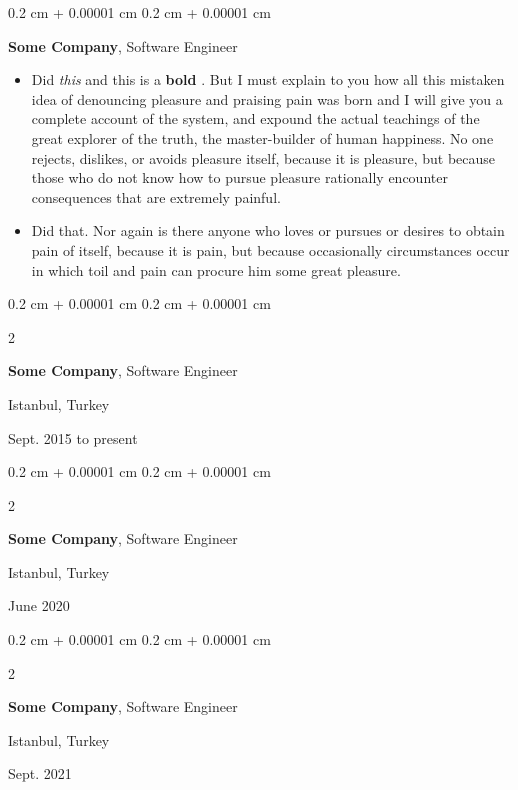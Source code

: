 \documentclass[10pt, letterpaper]{article}
\newenvironment{highlights}{
    \begin{itemize}[
        topsep=0.10 cm,
        parsep=0.10 cm,
        partopsep=0pt,
        itemsep=0pt,
        leftmargin=0.4 cm + 10pt
    ]
}{
    \end{itemize}
} %
\newenvironment{onecolentry}{
    \begin{adjustwidth}{
        0.2 cm + 0.00001 cm
    }{
        0.2 cm + 0.00001 cm
    }
}{
    \end{adjustwidth}
} %
\newenvironment{twocolentry}[2][]{
    \onecolentry
    \def\secondColumn{#2}
    \setcolumnwidth{\fill, 4.5 cm}
    \begin{paracol}{2}
}{
    \switchcolumn \raggedleft \secondColumn
    \end{paracol}
    \endonecolentry
} %
\let\hrefWithoutArrow\href
\renewcommand{\href}[2]{\hrefWithoutArrow{#1}{\mbox{\ifthenelse{\equal{#2}{}}{ }{#2 }\raisebox{.15ex}{\footnotesize \faExternalLink*}}}}
\begin{document}
        \begin{onecolentry}
            \textbf{Some \textnormal{Company}}, Software Engineer
            \begin{highlights}
                \item Did \textit{this} and this is a \textbf{bold} \href{https://example.com}{link}. But I must explain to you how all this mistaken idea of denouncing pleasure and praising pain was born and I will give you a complete account of the system, and expound the actual teachings of the great explorer of the truth, the master-builder of human happiness. No one rejects, dislikes, or avoids pleasure itself, because it is pleasure, but because those who do not know how to pursue pleasure rationally encounter consequences that are extremely painful.
                \item Did that. Nor again is there anyone who loves or pursues or desires to obtain pain of itself, because it is pain, but because occasionally circumstances occur in which toil and pain can procure him some great pleasure.
            \end{highlights}
        \end{onecolentry}


        \vspace{0.2 cm}

        \begin{twocolentry}{
            Istanbul, Turkey

        Sept. 2015 to present
        }
            \textbf{Some \textnormal{Company}}, Software Engineer
        \end{twocolentry}


        \vspace{0.2 cm}

        \begin{twocolentry}{
            Istanbul, Turkey

        June 2020
        }
            \textbf{Some \textnormal{Company}}, Software Engineer
        \end{twocolentry}


        \vspace{0.2 cm}

        \begin{twocolentry}{
            Istanbul, Turkey

        Sept. 2021
        }
            \textbf{Some \textnormal{Company}}, Software Engineer
        \end{twocolentry}
\end{document}

